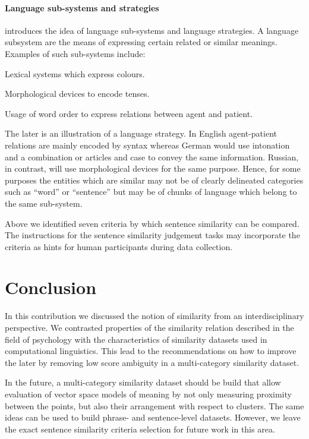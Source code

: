 \documentclass[11pt]{article}
\begin{document}
\paragraph{Language sub-systems and strategies}

 introduces the idea of language sub-systems and language strategies. A language subsystem are the means of expressing certain related or similar meanings. Examples of such sub-systems include:
\begin{compactitem}
    \item Lexical systems which express colours.
    \item Morphological devices to encode tenses.
    \item Usage of word order to express relations between agent and patient.
\end{compactitem}  
The later is an illustration of a language strategy. In English agent-patient relations are mainly encoded by syntax whereas German would use intonation and a combination or articles and case to convey the same information. Russian, in contrast, will use morphological devices for the same purpose. Hence, for some purposes the entities which are similar may not be of clearly delineated categories such as ``word'' or ``sentence'' but may be of chunks of language which belong to the same sub-system. 

Above we identified seven criteria by which sentence similarity can be compared. The instructions for the sentence similarity judgement tasks may incorporate the criteria as hints for human participants during data collection.

\section{Conclusion}

In this contribution we discussed the notion of similarity from an interdisciplinary perspective. We contrasted properties of the similarity relation described in the field of psychology with the characteristics of similarity datasets used in computational linguistics. This lead to the recommendations on how to improve the later by removing low score ambiguity in a multi-category similarity dataset.

In the future, a multi-category similarity dataset should be build that allow evaluation of vector space models of meaning by not only measuring proximity between the points, but also their arrangement with respect to clusters. The same ideas can be used to build phrase- and sentence-level datasets. However, we leave the exact sentence similarity criteria selection for future work in this area.
\end{document}
